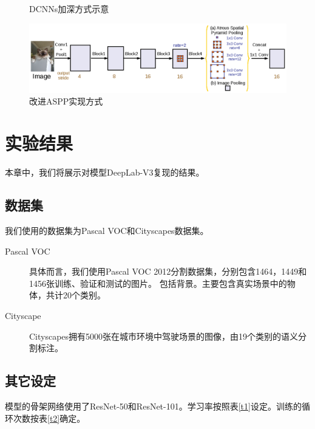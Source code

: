 \documentclass[10pt, a4paper]{article}
\begin{document}
\begin{figure}[htbp]
    \centering
    \caption{DCNNs加深方式示意}
    \label{p7}
\end{figure}

\begin{figure}[htbp]
    \centering
    \includegraphics[width=\textwidth]{p8.eps}
    \caption{改进ASPP实现方式}
    \label{p8}
\end{figure}

\section{实验结果}
本章中，我们将展示对模型DeepLab-V3复现的结果。

\subsection{数据集}
我们使用的数据集为Pascal VOC和Cityscapes数据集。
\begin{description}
    \item[Pascal VOC] 具体而言，我们使用Pascal VOC 2012分割数据集，分别包含1464，1449和1456张训练、验证和测试的图片。
    包括背景。主要包含真实场景中的物体，共计20个类别。
    \item[Cityscape] Cityscapes拥有5000张在城市环境中驾驶场景的图像，由19个类别的语义分割标注。
\end{description}

\subsection{其它设定}
模型的骨架网络使用了ResNet-50和ResNet-101。学习率按照表\ref{t1}设定。训练的循环次数按表\ref{t2}确定。
\end{document}
